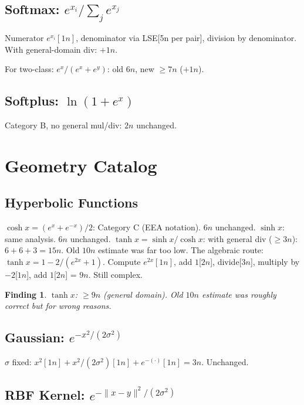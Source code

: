 \documentclass[11pt]{article}
\newtheorem{finding}[theorem]{Finding}
\newcommand{\ok}[1]{\textcolor{ok}{#1}}
\newcommand{\flag}[1]{\textcolor{flag}{#1}}
\begin{document}
\subsection{Softmax: $e^{x_i}/\sum_j e^{x_j}$}

Numerator $e^{x_i}[1n]$, denominator via LSE[5n per pair], division by denominator.
With general-domain div: $+1n$.

For two-class: $e^x/(e^x+e^y)$: old $6n$, new $\geq 7n$ (\flag{$+1n$}).

\subsection{Softplus: $\ln(1+e^x)$}

Category B, no general mul/div: \ok{$2n$ unchanged.}

\section{Geometry Catalog}

\subsection{Hyperbolic Functions}

$\cosh x = (e^x+e^{-x})/2$: Category C (EEA notation). \ok{$6n$ unchanged.}
$\sinh x$: same analysis. \ok{$6n$ unchanged.}
$\tanh x = \sinh x / \cosh x$: with general div ($\geq 3n$): $6+6+3 = 15n$. Old $10n$ estimate was far too low.
The algebraic route: $\tanh x = 1 - 2/(e^{2x}+1)$. Compute $e^{2x}[1n]$, add $1$[$2n$], divide[$3n$], multiply by $-2$[$1n$], add $1$[$2n$] = $9n$. Still complex.

\begin{finding}
$\tanh x$: \flag{$\geq 9n$} (general domain). Old $10n$ estimate was roughly correct but for wrong reasons.
\end{finding}

\subsection{Gaussian: $e^{-x^2/(2\sigma^2)}$}

$\sigma$ fixed: $x^2[1n] + x^2/(2\sigma^2)[1n] + e^{-(\cdot)}[1n] = 3n$. \ok{Unchanged.}

\subsection{RBF Kernel: $e^{-\|x-y\|^2/(2\sigma^2)}$}
\end{document}
